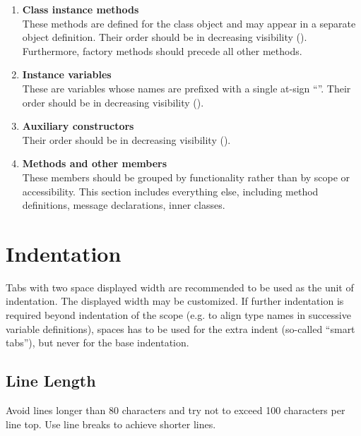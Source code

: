 \begin{enumerate}
\item {\bfseries Class instance methods} \hfill \\
These methods are defined for the class object and may appear in a separate object definition. Their order should be in decreasing visibility (). Furthermore, factory methods should precede all other methods. 

\item {\bfseries Instance variables} \hfill \\
These are variables whose names are prefixed with a single at-sign ``''. Their order should be in decreasing visibility ().

\item {\bfseries Auxiliary constructors} \hfill \\
Their order should be in decreasing visibility ().

\item {\bfseries Methods and other members} \hfill \\
These members should be grouped by functionality rather than by scope or accessibility. This section includes everything else, including method definitions, message declarations, inner classes. 
\end{enumerate}





\section{Indentation}

Tabs with two space displayed width are recommended to be used as the unit of indentation. The displayed width may be customized. If further indentation is required beyond indentation of the scope (e.g. to align type names in successive variable definitions), spaces has to be used for the extra indent (so-called ``smart tabs''), but never for the base indentation. 





\subsection{Line Length}

Avoid lines longer than 80 characters and try not to exceed 100 characters per line top. Use line breaks to achieve shorter lines. 






